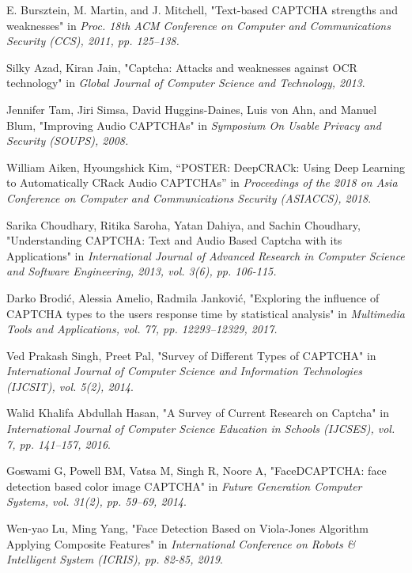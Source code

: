\begin{thebibliography}{9}
E. Bursztein, M. Martin, and J. Mitchell, "Text-based CAPTCHA strengths and weaknesses" in \emph{Proc. 18th ACM Conference on Computer and Communications Security (CCS), 2011, pp. 125–138.}

Silky Azad, Kiran Jain, "Captcha: Attacks and weaknesses against OCR technology" in \emph{Global Journal of Computer Science and Technology, 2013}.

Jennifer Tam, Jiri Simsa, David Huggins-Daines, Luis von Ahn, and Manuel Blum, "Improving Audio CAPTCHAs" in \emph{Symposium On Usable Privacy and Security (SOUPS), 2008.}

William Aiken, Hyoungshick Kim, “POSTER: DeepCRACk: Using Deep Learning to Automatically CRack Audio CAPTCHAs” in \emph{Proceedings of the 2018 on Asia Conference on Computer and Communications Security (ASIACCS), 2018}.

Sarika Choudhary, Ritika Saroha, Yatan Dahiya, and Sachin Choudhary, "Understanding CAPTCHA: Text and Audio Based Captcha with its Applications" in \emph{International Journal of Advanced Research in Computer Science and Software Engineering, 2013, vol. 3(6), pp. 106-115.}

Darko Brodi\'c, Alessia Amelio, Radmila Jankovi\'c, "Exploring the influence of CAPTCHA types to the users response time by statistical analysis" in \emph{Multimedia Tools and Applications, vol. 77, pp. 12293–12329, 2017.}

Ved Prakash Singh, Preet Pal, "Survey of Different Types of CAPTCHA" in \emph{International Journal of Computer Science and Information Technologies (IJCSIT), vol. 5(2), 2014}.

Walid Khalifa Abdullah Hasan, "A Survey of Current Research on Captcha" in \emph{International Journal of Computer Science Education in Schools (IJCSES), vol. 7, pp. 141–157, 2016}.

Goswami G, Powell BM, Vatsa M, Singh R, Noore A, "FaceDCAPTCHA: face detection based color image CAPTCHA" in \emph{Future Generation Computer Systems, vol. 31(2), pp. 59–69, 2014}.

Wen-yao Lu, Ming Yang, "Face Detection Based on Viola-Jones Algorithm Applying Composite Features" in \emph{International Conference on Robots \& Intelligent System (ICRIS), pp. 82-85, 2019}.


\end{thebibliography}
